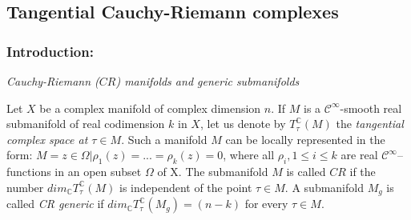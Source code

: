 \documentclass[12pt]{article}
\theoremstyle{plain}
\theoremstyle{definition}
\numberwithin{equation}{section}
\begin{document}
\subsection{Tangential Cauchy-Riemann complexes}

\subsubsection{Introduction:} \emph{Cauchy-Riemann ($CR$) manifolds and generic submanifolds}

 Let $X$ be a complex manifold of complex dimension $n$. If $M$ is a $\mathcal{C}^{\infty}$-smooth
real submanifold of real codimension $k$ in $X$, let us denote by $T_{\tau}^{\mathbb{C}} (M)$ the
\emph{tangential complex space at $\tau \in M$}. Such a manifold $M$ can be locally represented in the form:
$ M = { z \in \Omega | \rho_1(z)=...= \rho_k(z)=0}$, where all $\rho_i , 1 \leq i \leq k$ are real
$\mathcal{C}^{\infty}$--functions in an open subset $\Omega$ of X. The submanifold $M$ is called \emph{$CR$} if the
number $dim_{\mathbb{C}} T_{\tau}^{\mathbb{C}} (M)$ is independent of the point $\tau \in M$. A submanifold $M_g$
is called \emph{CR generic} if $dim_{\mathbb{C}} T_{\tau}^{\mathbb{C}} (M_g)= (n-k)$ for every $\tau \in M$.
\end{document}
